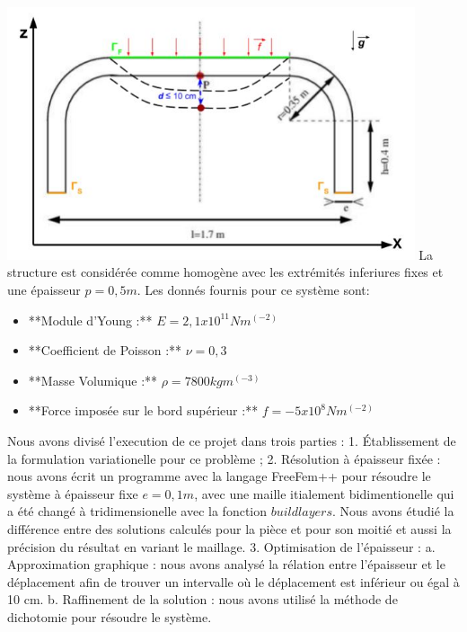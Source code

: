 \documentclass{article}
\begin{document}
    \begin{center}
	{ \includegraphics[width=12cm]{coupe_2D-schema.JPG}}
    La structure est considérée comme homogène avec les extrémités inferiures fixes et une épaisseur $p = 0,5 m$. Les donnés fournis pour ce système sont:
    \begin{itemize}
    \item **Module d'Young :** $E = 2,1x10^11 N m^(-2)$
    \item **Coefficient de Poisson :** $\nu = 0,3$
    \item **Masse Volumique :** $\rho = 7800 kg m^(-3)$
    \item **Force imposée sur le bord supérieur :** $f= - 5x10^8 N m^(-2)$
    \end{itemize}
    Nous avons divisé l'execution de ce projet dans trois parties :
    1. Établissement de la formulation variationelle pour ce problème ;
    2. Résolution à épaisseur fixée : nous avons écrit un programme avec la langage FreeFem++ pour résoudre le système à épaisseur fixe $e = 0,1 m$, avec une maille itialement bidimentionelle qui a été changé à tridimensionelle avec la fonction $buildlayers$. Nous avons étudié la différence entre des solutions calculés pour la pièce et pour son moitié et aussi la précision du résultat en variant le maillage.
    3. Optimisation de l'épaisseur : 
    	a. Approximation graphique : nous avons analysé la rélation entre l'épaisseur et le déplacement afin de trouver un intervalle où le déplacement est inférieur ou égal à 10 cm.
	b. Raffinement de la solution : nous avons utilisé la méthode de dichotomie pour résoudre le système.

\end{center}
\end{document}
